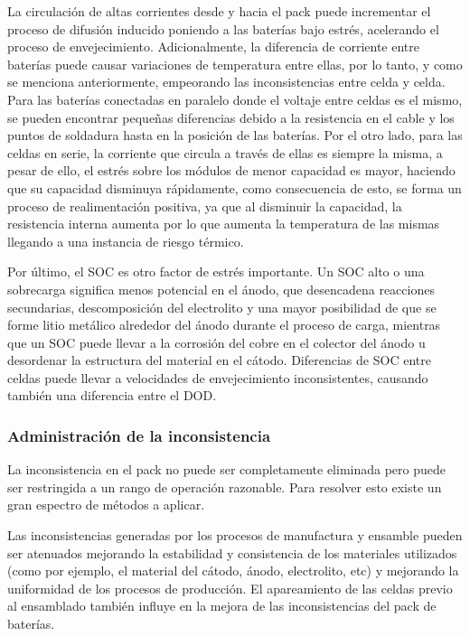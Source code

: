 La circulaci\'on de altas corrientes desde y hacia el pack puede incrementar el
proceso de difusi\'on inducido poniendo a las bater\'ias bajo estr\'es, 
acelerando el proceso de envejecimiento. Adicionalmente, la diferencia
de corriente entre bater\'ias puede causar variaciones de temperatura entre
ellas, por lo tanto, y como se menciona anteriormente, empeorando las
inconsistencias entre celda y celda. Para las bater\'ias conectadas en paralelo 
donde el voltaje entre celdas es el mismo, se pueden encontrar pequeñas 
diferencias debido a la resistencia en el cable y los puntos de soldadura hasta 
en la posici\'on de las bater\'ias. Por el otro lado, para las celdas en serie, 
la corriente que circula a trav\'es de ellas es siempre la misma, a pesar de 
ello, el estr\'es sobre los m\'odulos de menor capacidad es mayor, haciendo que 
su capacidad disminuya r\'apidamente, como consecuencia de esto, se forma un
proceso de realimentaci\'on positiva, ya que al disminuir la capacidad, la 
resistencia interna aumenta por lo que aumenta la temperatura de las mismas 
llegando a una instancia de riesgo t\'ermico.

Por \'ultimo, el \acrshort{SOC} es otro factor de estr\'es importante. Un
\acrshort{SOC} alto o una sobrecarga significa menos potencial en el \'anodo,
que desencadena reacciones secundarias, descomposici\'on del electrolito y una
mayor posibilidad de que se forme litio met\'alico alrededor del \'anodo 
durante el proceso de carga, mientras que un \acrshort{SOC} puede llevar a la 
corrosi\'on del cobre en el colector del \'anodo u desordenar la estructura del 
material en el c\'atodo. Diferencias de \acrshort{SOC} entre celdas puede llevar 
a velocidades de envejecimiento inconsistentes, causando tambi\'en una diferencia 
entre el \acrshort{DOD}.

\subsubsection{Administraci\'on de la inconsistencia}

La inconsistencia en el pack no puede ser completamente eliminada pero puede ser
restringida a un rango de operaci\'on razonable. Para resolver esto existe un 
gran espectro de m\'etodos a aplicar.

Las inconsistencias generadas por los procesos de manufactura y ensamble pueden
ser atenuados mejorando la estabilidad y consistencia de los materiales
utilizados (como por ejemplo, el material del c\'atodo, \'anodo, electrolito,
etc) y mejorando la uniformidad de los procesos de producci\'on. El apareamiento
de las celdas previo al ensamblado tambi\'en influye en la mejora de las
inconsistencias del pack de bater\'ias.

